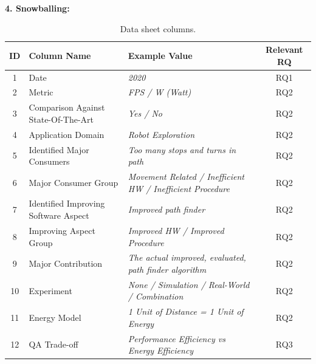 \noindent\textbf{4. Snowballing:}
\begin{table}[t]
    \centering
    \caption{Data sheet columns.}
    \begin{tabular}{cllc}
        \toprule
            ID &
            Column Name & 
            Example Value & 
            Relevant RQ  \\
        \midrule
            1 &
               Date & 
                \textit{2020} & 
                RQ1 \\

            2 &
                Metric & 
                \textit{FPS / W (Watt)} & 
                RQ2 \\

            3 &
                Comparison Against State-Of-The-Art & 
                \textit{Yes / No} & 
                RQ2 \\
                
            4 &
                Application Domain & 
                \textit{Robot Exploration} & 
                RQ2 \\

            5 & 
                Identified Major Consumers & 
                \textit{Too many stops and turns in path} & 
                RQ2 \\
            6 &
                Major Consumer Group &
                \textit{Movement Related / Inefficient HW / Inefficient Procedure} &
                RQ2 \\

            7 & 
                Identified Improving Software Aspect & 
                \textit{Improved path finder} & 
                RQ2 \\
            8 &
                Improving Aspect Group &
                \textit{Improved HW / Improved Procedure} &
                RQ2 \\
            9 &
                Major Contribution & 
                \textit{The actual improved, evaluated, path finder algorithm} & 
                RQ2 \\
            
            10 &
                Experiment & 
                \textit{None / Simulation / Real-World / Combination} & 
                RQ2 \\
            
            11 &
                Energy Model &
                \textit{1 Unit of Distance = 1 Unit of Energy} & 
                RQ2 \\
            
            12 &
                QA Trade-off & 
                \textit{Performance Efficiency vs Energy Efficiency} & 
                RQ3 \\
        \bottomrule
    \end{tabular}
    \label{table:data_sheet}
\end{table}
